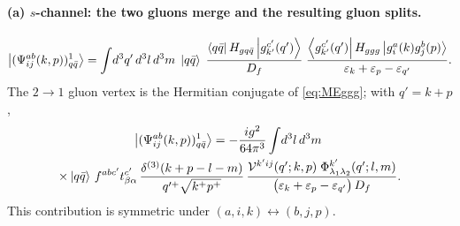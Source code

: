 \paragraph{(a) $s$-channel: the two gluons merge and the resulting gluon splits.}
\begin{center}
\end{center}
\begin{equation}
\left|(\Psi^{ab}_{ij}(k,p))^{1}_{q\bar q}\right\rangle=\int\! d^{3}q'\,d^{3}l\,d^{3}m\;
\left|q\bar q\right\rangle\;
\frac{\left\langle q\bar q\right|H_{gq\bar q}\left|g^{c'}_{k'}(q')\right\rangle}{D_{f}}\;
\frac{\left\langle g^{c'}_{k'}(q')\right|H_{ggg}\left|g^{a}_{i}(k)g^{b}_{j}(p)\right\rangle}{\varepsilon_{k}+\varepsilon_{p}-\varepsilon_{q'}} .
\end{equation}
The $2\to1$ gluon vertex is the Hermitian conjugate of \eqref{eq:MEggg}; with $q'=k+p$,
\begin{multline}
\left|(\Psi^{ab}_{ij}(k,p))^{1}_{q\bar q}\right\rangle=-\frac{ig^{2}}{64\pi^{3}}\int\!d^{3}l\,d^{3}m\;
\\
\times\left|q\bar q\right\rangle\,f^{abc'}t^{c'}_{\beta\alpha}\,
\frac{\delta^{(3)}(k+p-l-m)}{q'^{+}\sqrt{k^{+}p^{+}}}\,
\frac{\mathcal{V}^{k'ij}(q';k,p)\;\Phi^{k'}_{\lambda_{1}\lambda_{2}}(q';l,m)}
{\big(\varepsilon_{k}+\varepsilon_{p}-\varepsilon_{q'}\big)\,D_{f}} .
\label{eq:B1a}
\end{multline}
This contribution is symmetric under $(a,i,k)\leftrightarrow(b,j,p)$.

